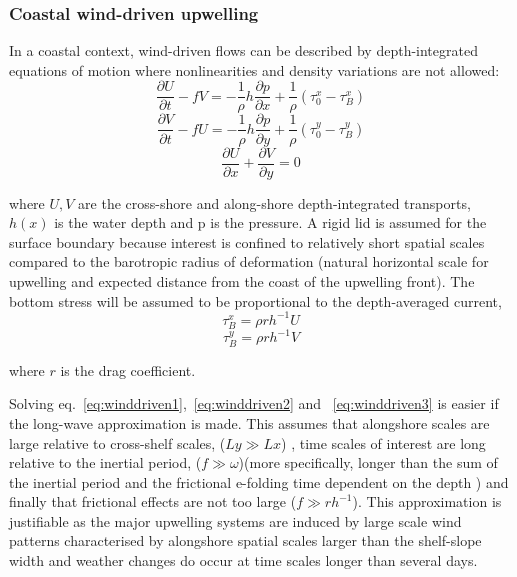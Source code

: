 \subsubsection{Coastal wind-driven upwelling}
In a coastal context, wind-driven flows can be described by
depth-integrated equations of motion where nonlinearities and
density variations are not allowed:
\begin{equation}\label{eq:winddriven1}
  \frac{\partial U}{\partial t}-fV=-\frac{1}{\rho}h\frac{\partial
  p}{\partial x}+\frac{1}{\rho}(\tau_0^x-\tau_B^x)
\end{equation}
\begin{equation}\label{eq:winddriven2}
   \frac{\partial V}{\partial t}-fU=-\frac{1}{\rho}h\frac{\partial
  p}{\partial y}+\frac{1}{\rho}(\tau_0^y-\tau_B^y)
\end{equation}
\begin{equation}\label{eq:winddriven3}
\frac{\partial U}{\partial x}+\frac{\partial V}{\partial y}=0
\end{equation}

where $U,V$ are the cross-shore and along-shore depth-integrated
transports, $h(x)$ is the water depth and p is the pressure. A
rigid lid is assumed for the surface boundary because interest is
confined to relatively short spatial scales compared to the
barotropic radius of deformation (natural horizontal scale for
upwelling and expected distance from the coast of the upwelling
front). The bottom stress will be assumed to be proportional to
the depth-averaged current,
\begin{equation}\label{eq:botstress1}
\tau_B^x=\rho rh^{-1}U
\end{equation}
\begin{equation}\label{eq:botstress2}
\tau_B^y=\rho rh^{-1}V
\end{equation}

where $r$ is the drag coefficient.

Solving eq.~\ref{eq:winddriven1},~\ref{eq:winddriven2} and
~\ref{eq:winddriven3} is easier if the long-wave approximation is
made. This assumes that alongshore scales are large relative to
cross-shelf scales, ($Ly \gg Lx$) , time scales of interest are
long relative to the inertial period, ($f \gg \omega$)(more
specifically, longer than the sum of the inertial period and the
frictional e-folding time dependent on the depth \citep{Dalu90})
and finally that frictional effects are not too large ($f\gg
rh^{-1}$). This approximation is justifiable as the major
upwelling systems are induced by large scale wind patterns
characterised by alongshore spatial scales larger than the
shelf-slope width and weather changes do occur at time scales
longer than  several days.

